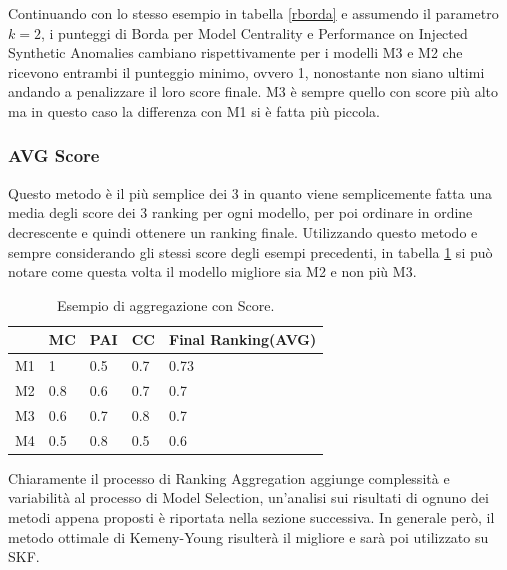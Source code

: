 Continuando con lo stesso esempio in tabella \ref{rborda} e assumendo il parametro \(k=2\), i punteggi di Borda per Model Centrality e Performance on Injected Synthetic Anomalies cambiano rispettivamente per i modelli M3 e M2 che ricevono entrambi il punteggio minimo, ovvero 1, nonostante non siano ultimi andando a penalizzare il loro score finale. M3 è sempre quello con score più alto ma in questo caso la differenza con M1 si è fatta più piccola.

\subsubsection{AVG Score}
Questo metodo è il più semplice dei 3 in quanto viene semplicemente fatta una media degli score dei 3 ranking per ogni modello, per poi ordinare in ordine decrescente e quindi ottenere un ranking finale.
Utilizzando questo metodo e sempre considerando gli stessi score degli esempi precedenti, in tabella \ref{score} si può notare come questa volta il modello migliore sia M2 e non più M3.

\begin{table}
	
	\centering
	\begin{tabular}{|l|l|l|l|l|}
		\hline
		   & MC  & PAI & CC  & Final Ranking(AVG) \\ \hline
		M1 & 1   & 0.5 & 0.7 & 0.73               \\ \hline
		M2 & 0.8 & 0.6 & 0.7 & 0.7                \\ \hline
		M3 & 0.6 & 0.7 & 0.8 & 0.7                \\ \hline
		M4 & 0.5 & 0.8 & 0.5 & 0.6                \\ \hline
	\end{tabular}
	\caption{\label{score}Esempio di aggregazione con Score.}
\end{table}


Chiaramente il processo di Ranking Aggregation aggiunge complessità e variabilità al processo di Model Selection, un'analisi sui risultati di ognuno dei metodi appena proposti è riportata nella sezione successiva. In generale però, il metodo ottimale di Kemeny-Young risulterà il migliore e sarà poi utilizzato su SKF.


